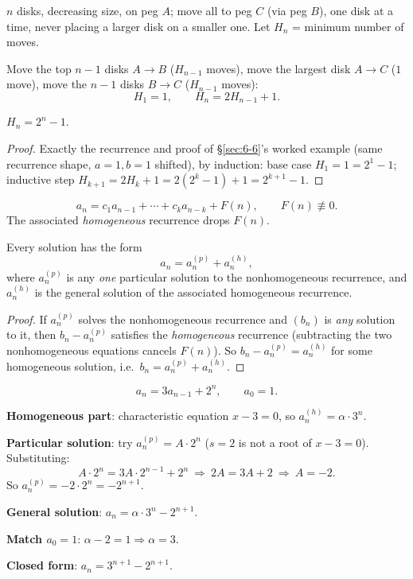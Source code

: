 \documentclass[11pt]{article}
\begin{document}
\begin{example}
$n$ disks, decreasing size, on peg $A$; move all to peg $C$ (via peg $B$), one disk at a time, never placing a larger disk on a smaller one. Let $H_n$ = minimum number of moves.
\end{example}
\begin{note}[Recurrence]
Move the top $n-1$ disks $A\to B$ ($H_{n-1}$ moves), move the largest disk $A\to C$ ($1$ move), move the $n-1$ disks $B\to C$ ($H_{n-1}$ moves):
\[
H_1=1, \qquad H_n = 2H_{n-1}+1.
\]
\end{note}
\begin{theorem}
$H_n = 2^n-1$.
\end{theorem}
\begin{proof}
Exactly the recurrence and proof of \S\ref{sec:6-6}'s worked example (same recurrence shape, $a=1,b=1$ shifted), by induction: base case $H_1=1=2^1-1$; inductive step $H_{k+1}=2H_k+1=2(2^k-1)+1=2^{k+1}-1$.
\end{proof}

\bigskip
\begin{definition}
\[
a_n = c_1a_{n-1}+\cdots+c_ka_{n-k} + F(n), \qquad F(n)\not\equiv0.
\]
The associated \emph{homogeneous} recurrence drops $F(n)$.
\end{definition}

\begin{theorem}
Every solution has the form
\[
a_n = a_n^{(p)} + a_n^{(h)},
\]
where $a_n^{(p)}$ is any \emph{one} particular solution to the nonhomogeneous recurrence, and $a_n^{(h)}$ is the general solution of the associated homogeneous recurrence.
\end{theorem}
\begin{proof}
If $a_n^{(p)}$ solves the nonhomogeneous recurrence and $(b_n)$ is \emph{any} solution to it, then $b_n-a_n^{(p)}$ satisfies the \emph{homogeneous} recurrence (subtracting the two nonhomogeneous equations cancels $F(n)$). So $b_n-a_n^{(p)} = a_n^{(h)}$ for some homogeneous solution, i.e.\ $b_n=a_n^{(p)}+a_n^{(h)}$.
\end{proof}

\begin{example}
\[
a_n = 3a_{n-1}+2^n, \qquad a_0=1.
\]

\textbf{Homogeneous part}: characteristic equation $x-3=0$, so $a_n^{(h)}=\alpha\cdot3^n$.

\textbf{Particular solution}: try $a_n^{(p)}=A\cdot2^n$ ($s=2$ is not a root of $x-3=0$). Substituting:
\[
A\cdot2^n = 3A\cdot2^{n-1}+2^n \ \Rightarrow\ 2A = 3A+2 \ \Rightarrow\ A=-2.
\]
So $a_n^{(p)}=-2\cdot2^n=-2^{n+1}$.

\textbf{General solution}: $a_n = \alpha\cdot3^n - 2^{n+1}$.

\textbf{Match $a_0=1$}: $\alpha-2=1\Rightarrow\alpha=3$.

\textbf{Closed form}: $a_n = 3^{n+1}-2^{n+1}$.
\end{example}
\end{document}

